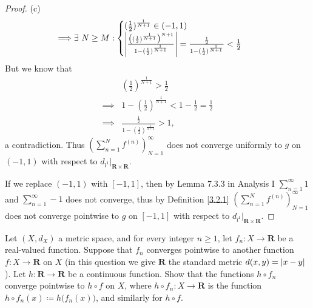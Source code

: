 \begin{proof}{(c)}
\begin{align*}
        \implies & \exists\ N \geq M : \begin{cases}
                                           (\frac{1}{2})^{\frac{1}{N + 1}} \in (-1, 1) \\
                                           \abs*{\frac{\big((\frac{1}{2})^{\frac{1}{N + 1}}\big)^{N + 1}}{1 - (\frac{1}{2})^{\frac{1}{N + 1}}}} = \frac{\frac{1}{2}}{1 - (\frac{1}{2})^{\frac{1}{N + 1}}} < \frac{1}{2}
                                       \end{cases}
    \end{align*}
    But we know that
    \begin{align*}
                 & (\frac{1}{2})^{\frac{1}{N + 1}} > \frac{1}{2}                       \\
        \implies & 1 - (\frac{1}{2})^{\frac{1}{N + 1}} < 1 - \frac{1}{2} = \frac{1}{2} \\
        \implies & \frac{\frac{1}{2}}{1 - (\frac{1}{2})^{\frac{1}{N + 1}}} > 1,
    \end{align*}
    a contradiction.
    Thus \((\sum_{n = 1}^N f^{(n)})_{N = 1}^\infty\) does not converge uniformly to \(g\) on \((-1, 1)\) with respect to \(d_{l^1}|_{\mathbf{R} \times \mathbf{R}}\).

    If we replace \((-1, 1)\) with \([-1, 1]\), then by Lemma 7.3.3 in Analysis I \(\sum_{n = 1}^\infty 1\) and \(\sum_{n = 1}^\infty -1\) does not converge, thus by Definition \ref{3.2.1} \((\sum_{n = 1}^N f^{(n)})_{N = 1}^\infty\) does not converge pointwise to \(g\) on \([-1, 1]\) with respect to \(d_{l^1}|_{\mathbf{R} \times \mathbf{R}}\).
\end{proof}

\begin{exercise}\label{ex 3.2.3}
    Let \((X, d_X)\) a metric space, and for every integer \(n \geq 1\), let \(f_n : X \to \mathbf{R}\) be a real-valued function.
    Suppose that \(f_n\) converges pointwise to another function \(f : X \to \mathbf{R}\) on \(X\)
    (in this question we give \(\mathbf{R}\) the standard metric \(d(x, y) = \abs*{x - y}\)).
    Let \(h : \mathbf{R} \to \mathbf{R}\) be a continuous function.
    Show that the functions \(h \circ f_n\) converge pointwise to \(h \circ f\) on \(X\), where \(h \circ f_n : X \to \mathbf{R}\) is the function \(h \circ f_n(x) \coloneqq h\big(f_n(x)\big)\), and similarly for \(h \circ f\).
\end{exercise}

